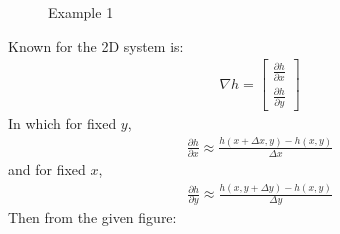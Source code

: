 \documentclass[letterpaper,10pt,english]{sphinxmanual}
\begin{document}
\begin{figure}[htbp]
\centering
\capstart

\noindent{}
\caption{Example 1}\label{\detokenize{contents/flow/lecture_06/16_darcy_law_3D:ex-1}}\end{figure}


Known for the 2D system is:
\begin{equation*}
\begin{split}
\nabla h = \begin{bmatrix} \frac{\partial h}{\partial x}
\\
\frac{\partial h}{\partial y} \end{bmatrix}
\end{split}
\end{equation*}
In which for fixed \(y\),
\begin{equation*}
\begin{split}
\frac{\partial h}{\partial x}\approx \frac{h(x+\Delta x, y)- h(x,y)}{\Delta x}
\end{split}
\end{equation*}
and for fixed \(x\),
\begin{equation*}
\begin{split}
\frac{\partial h}{\partial y}\approx \frac{h(x, y + \Delta y)- h(x,y)}{\Delta y}
\end{split}
\end{equation*}
Then from the given figure:
\end{document}
